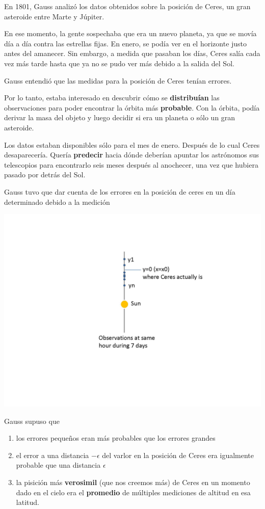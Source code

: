 \documentclass[
]{book}
\begin{document}
En 1801, Gauss analizó los datos obtenidos sobre la posición de Ceres, un gran asteroide entre Marte y Júpiter.

En ese momento, la gente sospechaba que era un nuevo planeta, ya que se movía día a día contra las estrellas fijas. En enero, se podía ver en el horizonte justo antes del amanecer. Sin embargo, a medida que pasaban los días, Ceres salía cada vez más tarde hasta que ya no se pudo ver más debido a la salida del Sol.

Gauss entendió que las medidas para la posición de Ceres tenían errores.

Por lo tanto, estaba interesado en descubrir cómo se \textbf{distribuían} las observaciones para poder encontrar la órbita más \textbf{probable}. Con la órbita, podía derivar la masa del objeto y luego decidir si era un planeta o sólo un gran asteroide.

Los datos estaban disponibles sólo para el mes de enero. Después de lo cual Ceres desaparecería. Quería \textbf{predecir} hacia dónde deberían apuntar los astrónomos sus telescopios para encontrarlo seis meses después al anochecer, una vez que hubiera pasado por detrás del Sol.

Gauss tuvo que dar cuenta de los errores en la posición de ceres en un día determinado debido a la medición

\includegraphics{./figures/ceres.JPG}

Gauss supuso que

\begin{enumerate}
\def\labelenumi{\arabic{enumi})}
\item
  los errores pequeños eran más probables que los errores grandes
\item
  el error a una distancia \(-\epsilon\) del varlor en la posición de Ceres era igualmente probable que una distancia \(\epsilon\)
\item
  la pisición más \textbf{verosimil} (que nos creemos más) de Ceres en un momento dado en el cielo era el \textbf{promedio} de múltiples mediciones de altitud en esa latitud.
\end{enumerate}
\end{document}
